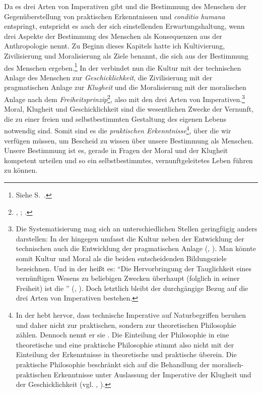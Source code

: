 Da es drei Arten von Imperativen gibt und die Bestimmung des Menschen der
Gegenüberstellung von praktischen Erkenntnissen und \emph{conditio humana}
entspringt, entspricht es auch der sich einstellenden Erwartungshaltung, wenn
 drei Aspekte der Bestimmung des Menschen als Konsequenzen
aus der Anthropologie nennt. Zu Beginn dieses Kapitels hatte ich Kultivierung,
Zivilisierung und Moralisierung als Ziele benannt, die sich aus der Bestimmung
des Menschen ergeben.\footnote{Siehe
S.~\pageref{Zitat:KultivierungZivilisierungMoralisierungalsBestimmungdesMenschen}.}
In der  verbindet  nun die Kultur mit der
technischen Anlage des Menschen zur \emph{Geschicklichkeit}, die Zivilisierung
mit der pragmatischen Anlage zur \emph{Klugheit} und die Moralisierung mit der
moralischen Anlage nach dem
\emph{Freiheitsprinzip}\footnote{\cite[Vgl.][A~316-321]{Kant:AnthropologieinpragmatischerHinsicht1977},
\cite[VII: 322.13--325.10]{Kant:GesammelteWerke1900ff.};
\cite[A 22\,f.,]{Kant:UeberPaedagogik1977} \cite[IX:
449.27--450.14]{Kant:GesammelteWerke1900ff.}.}, also mit den drei Arten von
Imperativen.\footnote{Die Systematisierung mag sich an unterschiedlichen Stellen
geringfügig anders darstellen: In der  hingegen umfasst die Kultur neben der
Entwicklung der technischen auch die Entwicklung der pragmatischen Anlage
\mkbibparens{\cite[vgl.][A 319]{Kant:AnthropologieinpragmatischerHinsicht1977},
\cite[VII: 323.21--324.11]{Kant:GesammelteWerke1900ff.}}. Man könnte somit
Kultur und Moral als die beiden entscheidenden Bildungsziele bezeichnen. Und in der  heißt es: \enquote{Die Hervorbringung der Tauglichkeit eines
vernünftigen Wesens zu beliebigen Zwecken überhaupt (folglich in seiner
Freiheit) ist die }
\mkbibparens{\cite[\S~83]{Kant:KritikderUrteilskraft2009}, \cite[V:
431.28--30]{Kant:GesammelteWerke1900ff.}}. Doch letztlich bleibt der
durchgängige Bezug auf die drei Arten von Imperativen bestehen.} Moral, Klugheit und
Geschicklichkeit sind die wesentlichen Zwecke der Vernunft, die zu einer freien
und selbstbestimmten Gestaltung des eigenen Lebens notwendig sind. Somit sind es
die \emph{praktischen Erkenntnisse}\footnote{In der  hebt  hervor, dass technische Imperative
auf Naturbegriffen beruhen und daher nicht zur praktischen, sondern zur
theoretischen Philosophie zählen. Dennoch nennt er sie
. Die Einteilung der Philosophie in eine
theoretische und eine praktische Philosophie stimmt also nicht mit der
Einteilung der Erkenntnisse in theoretische und praktische überein. Die
praktische Philosophie beschränkt sich auf die Behandlung der
moralisch-praktischen Erkenntnisse unter Auslassung der Imperative der
Klugheit und der Geschicklichkeit 
\mkbibparens{vgl. \cite[][xi---xii]{Kant:KritikderUrteilskraft2009},
\cite[][V: 171.4--172.22]{Kant:GesammelteWerke1900ff.}}.}, über die wir verfügen
müssen, um Bescheid zu wissen über unsere Bestimmung als Menschen. Unsere
Bestimmung ist es, gerade in Fragen der Moral und der Klugheit kompetent
urteilen und so ein selbstbestimmtes, vernunftgeleitetes Leben führen zu können.

